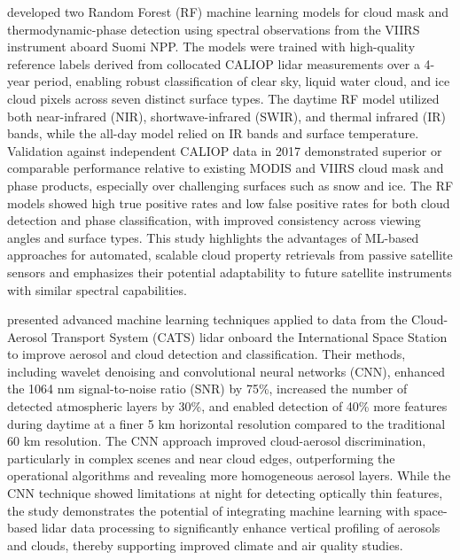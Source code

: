 \documentclass[11pt]{article}
\begin{document}
\citet{wang2020machine} developed two Random Forest (RF) machine learning models for cloud mask and thermodynamic-phase detection using spectral observations from the VIIRS instrument aboard Suomi NPP. The models were trained with high-quality reference labels derived from collocated CALIOP lidar measurements over a 4-year period, enabling robust classification of clear sky, liquid water cloud, and ice cloud pixels across seven distinct surface types. The daytime RF model utilized both near-infrared (NIR), shortwave-infrared (SWIR), and thermal infrared (IR) bands, while the all-day model relied on IR bands and surface temperature. Validation against independent CALIOP data in 2017 demonstrated superior or comparable performance relative to existing MODIS and VIIRS cloud mask and phase products, especially over challenging surfaces such as snow and ice. The RF models showed high true positive rates and low false positive rates for both cloud detection and phase classification, with improved consistency across viewing angles and surface types. This study highlights the advantages of ML-based approaches for automated, scalable cloud property retrievals from passive satellite sensors and emphasizes their potential adaptability to future satellite instruments with similar spectral capabilities.

\citet{yorks2021aerosol} presented advanced machine learning techniques applied to data from the Cloud-Aerosol Transport System (CATS) lidar onboard the International Space Station to improve aerosol and cloud detection and classification. Their methods, including wavelet denoising and convolutional neural networks (CNN), enhanced the 1064 nm signal-to-noise ratio (SNR) by 75\%, increased the number of detected atmospheric layers by 30\%, and enabled detection of 40\% more features during daytime at a finer 5 km horizontal resolution compared to the traditional 60 km resolution. The CNN approach improved cloud-aerosol discrimination, particularly in complex scenes and near cloud edges, outperforming the operational algorithms and revealing more homogeneous aerosol layers. While the CNN technique showed limitations at night for detecting optically thin features, the study demonstrates the potential of integrating machine learning with space-based lidar data processing to significantly enhance vertical profiling of aerosols and clouds, thereby supporting improved climate and air quality studies.
\end{document}
